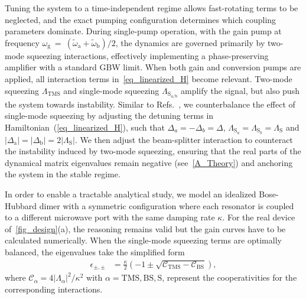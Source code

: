 \documentclass[%
reprint,
floatfix,
superscriptaddress,
amsmath,amssymb,
aps,
pra,
]{revtex4-2}
\begin{document}
Tuning the system to a time-independent regime allows fast-rotating terms to be neglected, and the exact pumping configuration determines which coupling parameters dominate. During single-pump operation, with the gain pump at frequency $\omega\mathrm{_g}$~=~$(\tilde{\omega}\mathrm{_a}+\tilde{\omega}\mathrm{_b})/2$, the dynamics are governed primarily by two-mode squeezing interactions, effectively implementing a phase-preserving amplifier with a standard GBW limit.
When both gain and conversion pumps are applied, all interaction terms in~\cref{eq_linearized_H} become relevant. 
Two-mode squeezing $\Lambda_{\mathrm{TMS}}$ and single-mode squeezing $\Lambda_{\mathrm{S}_{\mathrm{a/b}}}$ amplify the signal, but also push the system towards instability. Similar to Refs.~\cite{Ruddy2024Aug,Jiang2023Apr}, we counterbalance the effect of single-mode squeezing by adjusting the detuning terms in Hamiltonian~(\ref{eq_linearized_H}), such that $\Delta_a = - \Delta_b=\Delta$, $\Lambda_{\mathrm{S}_a} = \Lambda_{\mathrm{S}_b} = \Lambda_{\mathrm{S}}$ and  $|\Delta_{\mathrm{a}}| = |\Delta_{\mathrm{b}}| = 2 |\Lambda_{\mathrm{S}}|$. We then adjust the beam-splitter interaction to counteract the instability induced by two-mode squeezing, ensuring that the real parts of the dynamical matrix eigenvalues remain negative (see~\cref{A_Theory}) and anchoring the system in the stable regime.

In order to enable a tractable analytical study, we model an idealized Bose-Hubbard dimer with a symmetric configuration where each resonator is coupled to a different microwave port with the same damping rate $\kappa$. 
For the real device of~\cref{fig_design}(a), the reasoning remains valid but the gain curves have to be calculated numerically. When the single-mode squeezing terms are optimally balanced, the eigenvalues take the simplified form
%
\begin{align}
\label{Eigenvalues_MXP}
\epsilon_{\pm, \pm} & = \frac{\kappa}{2} \left(-1 \pm \sqrt{\mathcal{C}_{\mathrm{TMS}} - \mathcal{C}_{\mathrm{BS}}} \right), 
\end{align}
%
where $\mathcal{C}_{\alpha} = 4 |\Lambda_{\alpha}|^2/ \kappa^2$ with $\alpha = \mathrm{TMS}, \mathrm{BS}, \mathrm{S} $, represent the cooperativities for the corresponding interactions.
\end{document}
